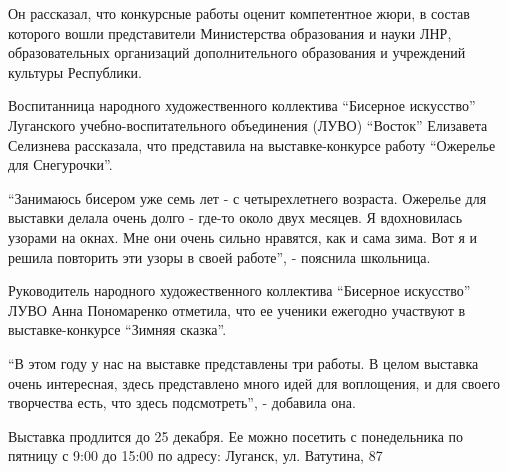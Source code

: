 Он рассказал, что конкурсные работы оценит компетентное жюри, в состав которого
вошли представители Министерства образования и науки ЛНР, образовательных
организаций дополнительного образования и учреждений культуры Республики.

Воспитанница народного художественного коллектива \enquote{Бисерное искусство}
Луганского учебно-воспитательного объединения (ЛУВО) \enquote{Восток} Елизавета
Селизнева рассказала, что представила на выставке-конкурсе работу \enquote{Ожерелье для
Снегурочки}.


\enquote{Занимаюсь бисером уже семь лет - с четырехлетнего возраста. Ожерелье для
выставки делала очень долго - где-то около двух месяцев. Я вдохновилась узорами
на окнах. Мне они очень сильно нравятся, как и сама зима. Вот я и решила
повторить эти узоры в своей работе}, - пояснила школьница.


Руководитель народного художественного коллектива \enquote{Бисерное искусство} ЛУВО
Анна Пономаренко отметила, что ее ученики ежегодно участвуют в
выставке-конкурсе \enquote{Зимняя сказка}.

\enquote{В этом году у нас на выставке представлены три работы. В целом выставка очень
интересная, здесь представлено много идей для воплощения, и для своего
творчества есть, что здесь подсмотреть}, - добавила она.

Выставка продлится до 25 декабря. Ее можно посетить с понедельника по пятницу с
9:00 до 15:00 по адресу: Луганск, ул. Ватутина, 87


